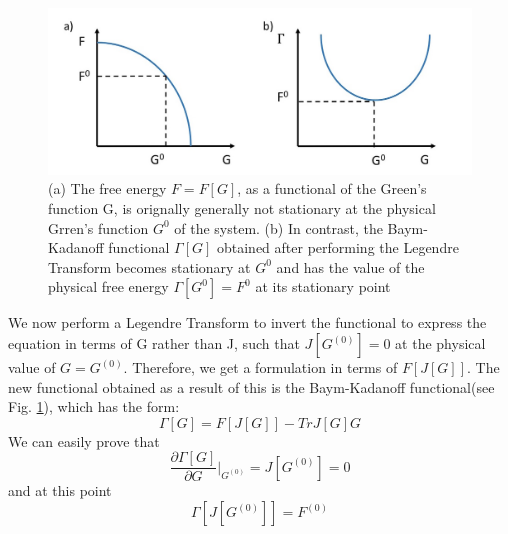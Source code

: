 \documentclass[10pt]{ruthesis}
\begin{document}
\begin{figure}[H]
\includegraphics[width=\columnwidth]{Legendre.jpg}
\caption{(a) The free energy $ F = F[G]$, as a functional of the Green’s function G, is orignally generally not  stationary at the physical Grren's function $G^0$ of the system. (b) In contrast, the Baym-Kadanoff functional $\Gamma[G]$ obtained after performing the Legendre Transform  becomes stationary at $G^0$  and has the value of the physical free energy $\Gamma[G^0] = F^0$ at its stationary point \label{Legendre}}
\end{figure} 

We now perform a Legendre Transform to invert the functional to express the equation in terms of G rather than J, such that $J[G^{(0)}]=0$ at the physical value of $G=G^{(0)}$. 
Therefore, we get a formulation in terms of $F[J[G]]$. The new functional obtained as a result of this is the Baym-Kadanoff functional(see Fig. \ref{Legendre}), which has the form:
\begin{equation}
\Gamma[G]= F[J[G]] -Tr J[G]G
\end{equation}
 We can easily prove that
 \begin{equation}
 \dfrac{\partial \Gamma[G]}{\partial G}\big|_{G^{(0)}}= J[G^{(0)}]=0 
 \end{equation}
 and at this point
 \begin{equation}
 \Gamma[ J[G^{(0)}]]= F^{(0)}
 \end{equation}
 
\end{document}
